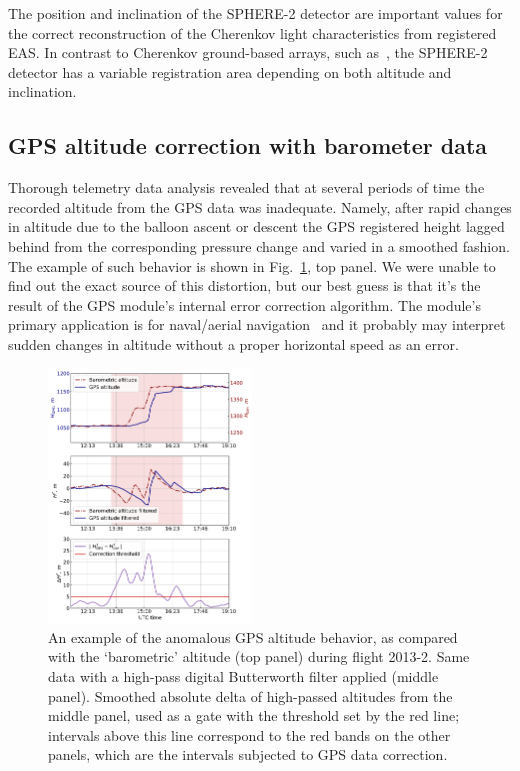 \documentclass[final,5p,times,twocolumn]{elsarticle}
\begin{document}
The position and inclination of the SPHERE-2 detector are important values for the correct reconstruction of the Cherenkov light characteristics from registered EAS. In contrast to Cherenkov ground-based arrays, such as~\cite{Yakutsk19,TUNKA133}, the SPHERE-2 detector has a variable registration area depending on both altitude and inclination.

\subsection{GPS altitude correction with barometer data}
\label{sect:gps_correction}

Thorough telemetry data analysis revealed that at several periods of time the recorded altitude from the GPS data was inadequate. Namely, after rapid changes in altitude due to the balloon ascent or descent the GPS registered height lagged behind from the corresponding pressure change and varied in a smoothed fashion. The example of such behavior is shown in Fig.~\ref{fig:h_corr}, top panel. We were unable to find out the exact source of this distortion, but our best guess is that it's the result of the GPS module's internal error correction algorithm. The module's primary application is for naval/aerial navigation~\cite{GPS-module-specs} and it probably may interpret sudden changes in altitude without a proper horizontal speed as an error.

\begin{figure}[tb]
    \includegraphics[width=0.48\textwidth]{height_correction.pdf} 
    \caption{An example of the anomalous GPS altitude behavior, as compared with the `barometric' altitude (top panel) during flight 2013-2. Same data with a high-pass digital Butterworth filter applied (middle panel). Smoothed absolute delta of high-passed altitudes from the middle panel, used as a gate with the threshold set by the red line; intervals above this line correspond to the red bands on the other panels, which are the intervals subjected to GPS data correction.}
\label{fig:h_corr}
\end{figure}
\end{document}
